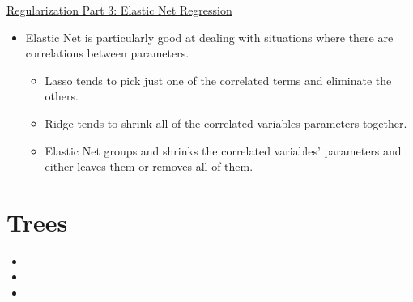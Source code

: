 \documentclass[12pt, titlepage, french]{report}
\begin{document}
\begin{YTB_SUMM_AUTO_NUMB}[label = {SQ-reg-3-elasticnet}]{\href{https://www.youtube.com/watch?v=1dKRdX9bfIo&feature=youtu.be}{Regularization Part 3: Elastic Net Regression}}
\begin{itemize}[leftmargin = *]
\begin{center}
\begin{tabular}{|	c	|	c	|	c	|}
			$\lambda_{1} = 0$	&	$\lambda_{2} > 0$	&	Ridge 	\\
			$\lambda_{1} > 0$	&	$\lambda_{2} > 0$	&	Elastic Net 	\\\hline
			\end{tabular}
		\end{center}
	\item	Elastic Net is particularly good at dealing with situations where there are correlations between parameters.
		\begin{itemize}
		\item	Lasso tends to pick just one of the correlated terms and eliminate the others.
		\item	Ridge tends to shrink all of the correlated variables parameters together.
		\item	Elastic Net groups and shrinks the correlated variables’ parameters and either leaves them or removes all of them.
		\end{itemize}
\end{itemize}
\end{YTB_SUMM_AUTO_NUMB}

\pagebreak
\section{Trees}

\begin{YTB_vids}
\begin{itemize}
	\item	{}
	\item	{}
	\item	{}
\end{itemize}
\end{YTB_vids}
\end{document}
